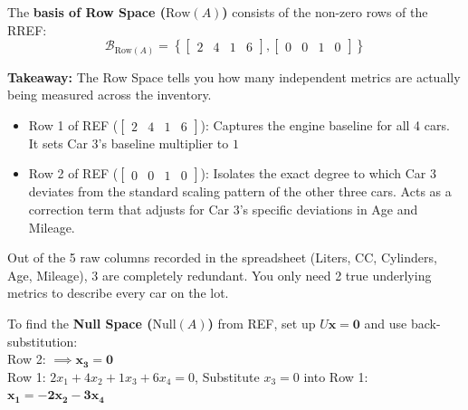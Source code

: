 \documentclass[DIV=20,oneside]{scrartcl}
\newcommand{\takeaway}[1]{%
	\begin{tcolorbox}[
		colback=black!20,
		colframe=black,
		boxrule=0.5pt,
		arc=2mm]
		\textbf{Takeaway: } #1
	\end{tcolorbox}
}
\begin{document}
The \textbf{basis of Row Space ($\text{Row}(A)$)} consists of the non-zero rows of the RREF:
$$\mathcal{B}_{\text{Row}(A)} = \left\{ \begin{bmatrix} 2 & 4 & 1 & 6 \end{bmatrix}, \begin{bmatrix} 0 & 0 & 1 & 0 \end{bmatrix} \right\}$$

\takeaway{The Row Space tells you how many independent metrics are actually being measured across the inventory.
	\begin{itemize}
		\item Row 1 of REF ($\begin{bmatrix} 2 & 4 & 1 & 6 \end{bmatrix}$): Captures the engine baseline for all 4 cars. It sets Car 3's baseline multiplier to $1$
		\item Row 2 of REF ($\begin{bmatrix} 0 & 0 & 1 & 0 \end{bmatrix}$): Isolates the exact degree to which Car 3 deviates from the standard scaling pattern of the other three cars. Acts as a correction term that adjusts for Car 3's specific deviations in Age and Mileage.
	\end{itemize} 
Out of the 5 raw columns recorded in the spreadsheet (Liters, CC, Cylinders, Age, Mileage), 3 are completely redundant. You only need 2 true underlying metrics to describe every car on the lot.\\
}
To find the \textbf{Null Space ($\text{Null}(A)$)} from REF, set up $U\mathbf{x} = \mathbf{0}$ and use back-substitution:\\
Row 2:  $\implies \mathbf{x_3 = 0}$\\
Row 1: $2x_1 + 4x_2 + 1x_3 + 6x_4 = 0$, Substitute $x_3 = 0$ into Row 1: 
$\mathbf{x_1 = -2x_2 - 3x_4}$
\end{document}
